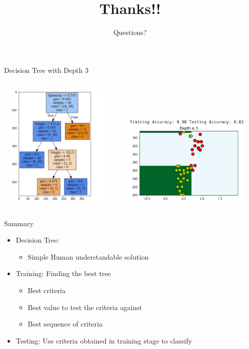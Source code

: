 \documentclass[aspectratio=169,14pt]{beamer}
\begin{document}
\begin{frame}{Decision Tree with Depth 3}
\begin{columns}
\column{8cm}
\centering
\includegraphics[width=6cm, height=6cm]{Images/dtree3.png}
\column{8cm}
\includegraphics[width=7cm, height=4.5cm]{Images/depth3.png} \\

\end{columns}
\end{frame}

\begin{frame}{Summary}
\begin{itemize}
\item \alert{Decision Tree:}
	\begin{itemize}
		\item  Simple Human understandable solution
	\end{itemize}
\item \alert{Training:} Finding the best tree
	\begin{itemize}
		\item  Best criteria
		\item  Best value to test the criteria against
		\item  Best sequence of criteria
	\end{itemize}
\item \alert{Testing:} Use criteria obtained in training stage to classify
\end{itemize}
\end{frame}


{\1
\begin{frame}
	\title{Thanks!!}
	\subtitle{Questions?}
	\maketitle
\end{frame}
}
\end{document}
